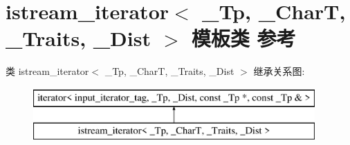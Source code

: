 \hypertarget{classistream__iterator}{}\section{istream\+\_\+iterator$<$ \+\_\+\+Tp, \+\_\+\+CharT, \+\_\+\+Traits, \+\_\+\+Dist $>$ 模板类 参考}
\label{classistream__iterator}
类 istream\+\_\+iterator$<$ \+\_\+\+Tp, \+\_\+\+CharT, \+\_\+\+Traits, \+\_\+\+Dist $>$ 继承关系图\+:\begin{figure}[H]
\begin{center}
\leavevmode
\includegraphics[height=2.000000cm]{classistream__iterator}
\end{center}
\end{figure}
